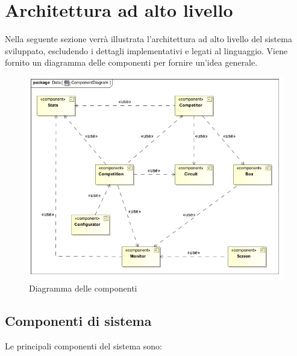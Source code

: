 \section{Architettura ad alto livello}
Nella seguente sezione verr\`{a} illustrata l'architettura ad alto livello del sistema sviluppato, 
escludendo i dettagli implementativi e legati al linguaggio. Viene fornito un diagramma delle componenti per fornire un'idea
generale.\\
\begin{center}
\begin{figure}[h!]
	\includegraphics[scale=0.50]{img/ComponentDiagram.jpg}
	\caption{Diagramma delle componenti}
\end{figure}
\end{center}
\subsection{Componenti di sistema}
Le principali componenti del sistema sono:
